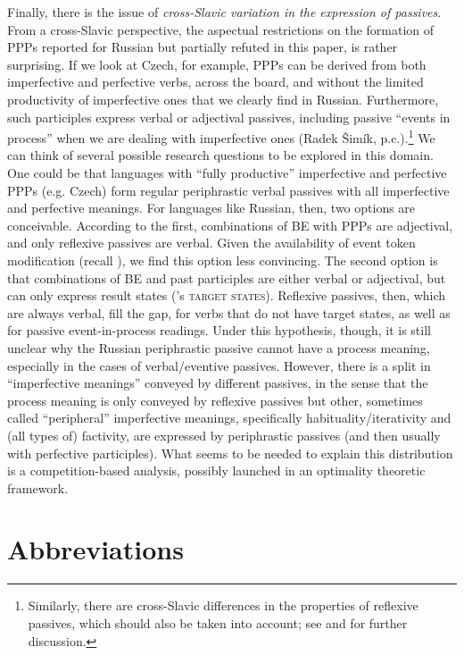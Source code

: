 \documentclass[output=paper,modfonts,newtxmath,hidelinks
]{langscibook}
\begin{document}
Finally, there is the issue of \textit{cross-Slavic variation in the expression of passives}. From a cross-Slavic perspective, the aspectual restrictions on the formation of PPPs reported for Russian but partially refuted in this paper, is rather surprising. If we look at Czech, for example, PPPs can be derived from both imperfective and perfective verbs, across the board, and without the limited productivity of imperfective ones that we clearly find in Russian. Furthermore, such participles express verbal or adjectival passives, including passive ``events in process'' when we are dealing with imperfective ones (Radek Šimík, p.c.).\footnote{Similarly, there are cross-Slavic differences in the properties of reflexive passives, which should also be taken into account; see \citet{fehrmann+10} and \citet{schaefer16} for further discussion.} We can think of several possible research questions to be explored in this domain. One could be that languages with ``fully productive'' imperfective and perfective PPPs (e.g. Czech) form regular periphrastic verbal passives with all imperfective and perfective meanings. For languages like Russian, then, two options are conceivable. According to the first, combinations of BE with PPPs are adjectival, and only reflexive passives are verbal. Given the availability of event token modification (recall ), we find this option less convincing. The second option is that combinations of BE and past participles are either verbal or adjectival, but can only express result states (\citeauthor{kratzer00}'s \citeyear{kratzer00} \textsc{target states}). Reflexive passives, then, which are always verbal, fill the gap, for verbs that do not have target states, as well as for passive event-in-process readings. Under this hypothesis, though, it is still unclear why the Russian periphrastic passive cannot have a process meaning, especially in the cases of verbal/eventive passives. However, there is a split in ``imperfective meanings'' conveyed by different passives, in the sense that the process meaning is only conveyed by reflexive passives but other, sometimes called ``peripheral'' imperfective meanings, specifically habituality/iterativity and (all types of) factivity, are expressed by periphrastic passives (and then usually with perfective participles). What seems to be needed to explain this distribution is a competition-based analysis, possibly launched in an optimality theoretic framework. 

\largerpage[2]
\section*{Abbreviations}
\end{document}
